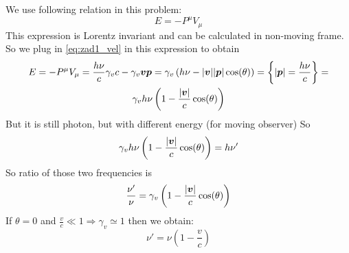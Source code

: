 We use following relation in this problem:
%
\begin{equation}
    E = -P^\mu V_\mu
\end{equation}
%
This expression is Lorentz invariant and can be calculated in non-moving frame.
So we plug in \autoref{eq:zad1_vel} in this expression to obtain
%
\begin{multline}
    E = -P^\mu V_\mu = \frac{h\nu}{c}\gamma_v c - \gamma_v \boldsymbol{v}\boldsymbol{p} = 
    \gamma_v\left(h\nu - |\boldsymbol{v}||\boldsymbol{p}|\cos(\theta)\right) = 
    \left\{|\boldsymbol{p}| = \frac{h\nu}{c}\right\} =\\
    \gamma_vh\nu\left(1-\frac{|\boldsymbol{v}|}{c}\cos(\theta)\right)
\end{multline}
%
But it is still photon, but with different energy (for moving observer) So
%
\begin{equation}
    \gamma_vh\nu\left(1-\frac{|\boldsymbol{v}|}{c}\cos(\theta)\right) = h\nu'
\end{equation}
%
So ratio of those two frequencies is
%
\begin{equation}
    \frac{\nu'}{\nu} = \gamma_v\left(1-\frac{|\boldsymbol{v}|}{c}\cos(\theta)\right)
\end{equation}
%
If $\theta = 0$ and $\frac{v}{c} \ll 1 \Rightarrow \gamma_v \simeq 1$ then we
obtain:
%
\begin{equation}
    \boxed{\nu' = \nu \left(1-\frac{v}{c}\right)}
\end{equation}

\newpage

\chapter{}

\problem
\subproblem

